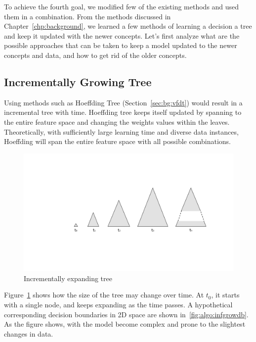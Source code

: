 To achieve the fourth goal, we modified few of the existing methods and used them in a combination. From the methods discussed in Chapter~\ref{chp:background}, we learned a few methods of learning a decision a tree and keep it updated with the newer concepts. Let's first analyze what are the possible approaches that can be taken to keep a model updated to the newer concepts and data, and how to get rid of the older concepts.

\subsection{Incrementally Growing Tree}
Using methods such as Hoeffding Tree (Section~\ref{sec:bg:vfdt}) would result in a incremental tree with time. Hoeffding tree keeps itself updated by spanning to the entire feature space and changing the weights values within the leaves. Theoretically, with sufficiently large learning time and diverse data instances, Hoeffding will span the entire feature space with all possible combinations.

\begin{figure}[htbp]
    \begin{center}
        \includegraphics[width=14.0cm]{figs/infgrow.pdf}
        \caption{Incrementally expanding tree}
        \label{fig:algo:infgrow}
    \end{center}
\end{figure}

Figure~\ref{fig:algo:infgrow} shows how the size of the tree may change over time. At $t_0$, it starts with a single node, and keeps expanding as the time passes. A hypothetical corresponding decision boundaries in 2D space are shown in~\ref{fig:algo:infgrowdb}. As the figure shows, with the model become complex and prone to the slightest changes in data.


